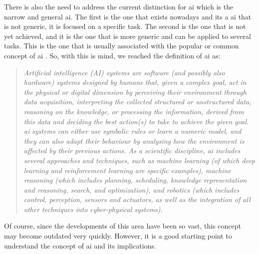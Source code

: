 There is also the need to address the current distinction for \ac{ai} which is the narrow and general \ac{ai}. The first is the one that exists nowadays and its a \ac{ai} that is not generic, it is focused on a specific task. The second is the one that is not yet achieved, and it is the one that is more generic and can be applied to several tasks. This is the one that is usually associated with the popular or common concept of \ac{ai} \cite{DefinitionAIMain2019,DBLP:books/aw/RN2020}. So, with this is mind, we reached the definition of \ac{ai} as:
\begin{quote}
    \textit{Artificial intelligence (AI) systems are software (and possibly also hardware) systems designed by humans that, given a complex goal, act in the physical or digital dimension by perceiving their environment through data acquisition, interpreting the collected structured or unstructured data, reasoning on the knowledge, or processing the information, derived from this data and deciding the best action(s) to take to achieve the given goal. \ac{ai} systems can either use symbolic rules or learn a numeric model, and they can also adapt their behaviour by analysing how the environment is affected by their previous actions. As a scientific discipline, \ac{ai} includes several approaches and techniques, such as machine learning (of which deep learning and reinforcement learning are specific examples), machine reasoning (which includes planning, scheduling, knowledge representation and reasoning, search, and optimization), and robotics (which includes control, perception, sensors and actuators, as well as the integration of all other techniques into cyber-physical systems).} \cite{DefinitionAIMain2019}
    \end{quote}

Of course, since the developments of this area have been so vast, this concept may become outdated very quickly. However, it is a good starting point to understand the concept of \ac{ai} and its implications.



